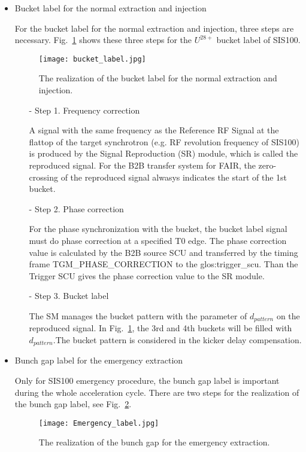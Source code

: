 \begin{itemize}
\item Bucket label for the normal extraction and injection

For the bucket label for the normal extraction and injection, three steps are necessary. Fig.~\ref{bucket_label} shows these three steps for the $U^{28+}$ bucket label of SIS100.
\begin{figure}[!htb]
   \centering   
   \texttt{[image: bucket\_label.jpg]}
   \caption{The realization of the bucket label for the normal extraction and injection.}
   \label{bucket_label}
\end{figure}  
\begin{itemize}
\item[-] Step 1. Frequency correction

A signal with the same frequency as the Reference RF Signal at the flattop of the target synchrotron (e.g. RF revolution frequency of SIS100) is produced by the Signal Reproduction (\gls{SR}) module, which is called the reproduced signal. For the B2B transfer system for FAIR, the zero-crossing of the reproduced signal alwasys indicates the start of the 1st bucket.
\item[-] Step 2. Phase correction

For the phase synchronization with the bucket, the bucket label signal must do phase correction at a specified T0 edge. The phase correction value is calculated by the B2B source SCU and transferred by the timing frame TGM\_PHASE\_CORRECTION to the \gls{glos:trigger_scu}. Than the Trigger SCU gives the phase correction value to the SR module.

\item[-] Step 3. Bucket label

The SM manages the bucket pattern with the parameter of $d_{pattern}$ on the reproduced signal. In Fig.~\ref{bucket_label}, the 3rd and 4th buckets will be filled with $d_{pattern}$.The bucket pattern is considered in the kicker delay compensation. 
\end{itemize}

\item Bunch gap label for the emergency extraction

Only for SIS100 emergency procedure, the bunch gap label is important during the whole acceleration cycle. There are two steps for the realization of the bunch gap label, see Fig.~\ref{Emergency_label}.
\begin{figure}[!htb]
   \centering   
   \texttt{[image: Emergency\_label.jpg]}
   \caption{The realization of the bunch gap for the emergency extraction.}
   \label{Emergency_label}
\end{figure} 


\end{itemize}
